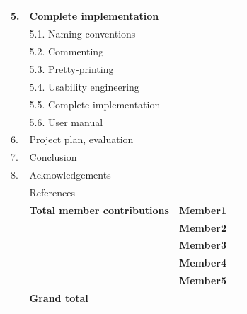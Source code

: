 \documentclass[12pt,a4paper]{article}
\begin{document}
\begin{longtable}{| p{0.2cm} p{6.25cm} | p{3cm}| p{5cm} |}
  5. & Complete implementation &  &  \\ \hline
   & 5.1. Naming conventions &  &  \\ \hline
   & 5.2. Commenting &  &  \\ \hline
   & 5.3. Pretty-printing &  &  \\ \hline
   & 5.4. Usability engineering &  &  \\ \hline
   & 5.5. Complete implementation &  &  \\ \hline
   & 5.6. User manual &  &  \\ \hline
  6. & Project plan, evaluation &  &  \\ \hline
  7. & Conclusion &  &  \\ \hline
  8. & Acknowledgements &  &  \\ \hline
   & References &  &  \\ \hline
    & \textbf{Total member contributions} & \textbf{Member1} & \\ \cline{3-4}
    &  & \textbf{Member2} & \\ \cline{3-4}
    &  & \textbf{Member3} & \\ \cline{3-4}
    &  & \textbf{Member4} & \\ \cline{3-4}
    &  & \textbf{Member5} & \\ \hline
    & \textbf{Grand total} &  &  \\ \hline
\end{longtable}
\end{document}
